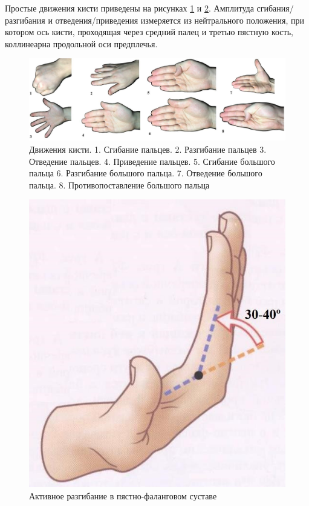 \hspace{0.6cm}Простые движения кисти приведены на рисунках \ref{fig:hand_motions} и \ref{fig:hand_extension}. Амплитуда сгибания/разгибания и отведения/приведения измеряется из нейтрального положения, при котором ось кисти, проходящая через средний палец и третью пястную кость, коллинеарна продольной оси предплечья.  

\begin{figure}[ht!]
	\centering
	\includegraphics[scale=0.65]{hand_motion.jpg}
	\caption{Движения кисти. 1. Сгибание пальцев. 2. Разгибание пальцев 3. Отведение пальцев. 4. Приведение пальцев. 5. Сгибание большого пальца 6. Разгибание большого пальца. 7. Отведение большого пальца. 8. Противопоставление большого пальца}
	\label{fig:hand_motions}
\end{figure}

\begin{figure}[ht!]
	\centering
	\includegraphics[scale=0.4]{hand_extension.jpg}
	\caption{Активное разгибание в пястно-фаланговом суставе}
	\label{fig:hand_extension}
\end{figure}

